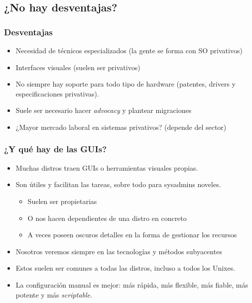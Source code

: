 \documentclass{beamer}
\begin{document}

\subsection{¿No hay desventajas?}
\begin{frame}
\frametitle{Desventajas}

\pause

\begin{itemize}
\item Necesidad de técnicos especializados (la gente se forma con SO privativos)
\item Interfaces visuales (suelen ser privativos)
\item No siempre hay soporte para todo tipo de hardware (patentes, drivers y especificaciones privativas).
\item Suele ser necesario hacer \textit{advocacy} y plantear migraciones
\item ¿Mayor mercado laboral en sistemas privativos? (depende del sector)
\end{itemize}
\end{frame}


\begin{frame}
\frametitle{¿Y qué hay de las GUIs?}

\pause

\begin{itemize}
\item Muchas distros traen GUIs o herramientas visuales propias. 
\item Son útiles y facilitan las tareas, sobre todo para sysadmins noveles.
	\begin{itemize}
	\item Suelen ser propietarias
	\item O nos hacen dependientes de una distro en concreto
	\item A veces poseen oscuros detalles en la forma de gestionar los recursos
	\end{itemize}
\item Nosotros veremos siempre en las tecnologías y métodos subyacentes
\item Estos suelen ser comunes a todas las distros, incluso a todos los Unixes.
\item La configuración manual es mejor: más rápida, más flexible, más fiable, más potente y más \textit{scriptable}.
\end{itemize}
\end{frame}
\end{document}
